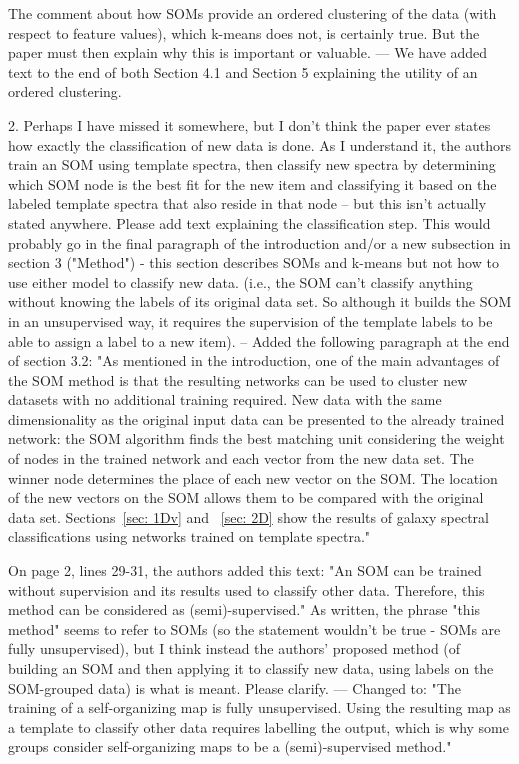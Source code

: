 The comment about how SOMs provide an ordered clustering of the data (with respect to feature values), which k-means does not, is certainly true.  But the paper must then explain why this is important or valuable.
--- We have added text to the end of both Section 4.1 and Section 5 explaining the utility of an ordered clustering.

2. Perhaps I have missed it somewhere, but I don't think the paper ever states how exactly the classification of new data is done.  As I understand it, the authors train an SOM using template spectra, then classify new spectra by determining which SOM node is the best fit for the new item and classifying it based on the labeled template spectra that also reside in that node -- but this isn't actually stated anywhere.  Please add text explaining the classification step.  This would probably go in the final paragraph of the introduction and/or a new subsection in section 3 ("Method") - this section describes SOMs and k-means but not how to use either model to classify new data. (i.e., the SOM can't classify anything without knowing the labels of its original data set.  So although it builds the SOM in an unsupervised way, it requires the supervision of the template labels to be able to assign a label to a new item).
-- Added the following paragraph  at the end of section 3.2: 
    "As mentioned in the introduction, one of the main advantages of the SOM method  is that the resulting networks can be used to cluster new datasets with no additional training required. 
     New data with the same dimensionality as the original input data can be presented to the already trained network: the SOM algorithm finds the best matching unit considering the weight of nodes in the trained network and each vector from the new data set.
     The winner node determines the place of each new vector on the SOM.
     The location of the new vectors on the SOM allows them to be compared with the original data set. 
     Sections~\ref{sec: 1Dv} and ~\ref{sec: 2D} show the results of galaxy spectral classifications using networks trained on template spectra."

On page 2, lines 29-31, the authors added this text: "An SOM can be trained without supervision and its results used to classify other data. Therefore, this method can be considered as (semi)-supervised." As written, the phrase "this method" seems to refer to SOMs (so the statement wouldn't be true - SOMs are fully unsupervised), but I think instead the authors' proposed method (of building an SOM and then applying it to classify new data, using labels on the SOM-grouped data) is what is meant.  Please clarify.
--- Changed to: 
    "The training of a self-organizing map is fully unsupervised.
     Using the resulting map as a template to classify other data requires labelling the output, which is why some groups consider self-organizing maps to be a (semi)-supervised method."

